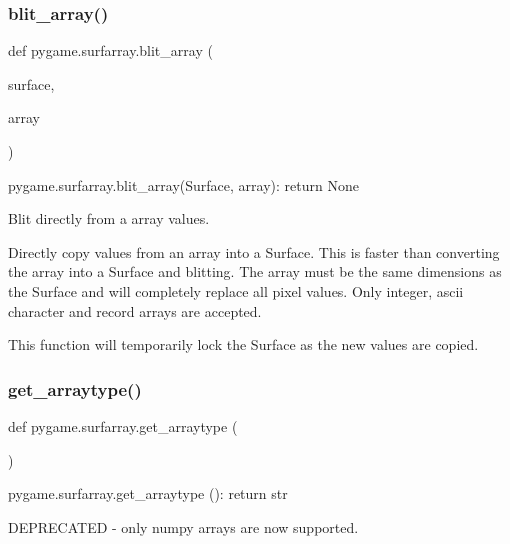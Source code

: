 \subsubsection{\texorpdfstring{blit\+\_\+array()}{blit\_array()}}
{\footnotesize\ttfamily def pygame.\+surfarray.\+blit\+\_\+array (\begin{DoxyParamCaption}\item[{}]{surface,  }\item[{}]{array }\end{DoxyParamCaption})}

\begin{DoxyVerb}pygame.surfarray.blit_array(Surface, array): return None

Blit directly from a array values.

Directly copy values from an array into a Surface. This is faster than
converting the array into a Surface and blitting. The array must be the
same dimensions as the Surface and will completely replace all pixel
values. Only integer, ascii character and record arrays are accepted.

This function will temporarily lock the Surface as the new values are
copied.
\end{DoxyVerb}
 \mbox{\label{namespacepygame_1_1surfarray_aedf2dcad61b5808f388b4e81952c048d}} 
\subsubsection{\texorpdfstring{get\+\_\+arraytype()}{get\_arraytype()}}
{\footnotesize\ttfamily def pygame.\+surfarray.\+get\+\_\+arraytype (\begin{DoxyParamCaption}{ }\end{DoxyParamCaption})}

\begin{DoxyVerb}pygame.surfarray.get_arraytype (): return str

DEPRECATED - only numpy arrays are now supported.
\end{DoxyVerb}
 \mbox{\label{namespacepygame_1_1surfarray_a89e8a065ab841be09f1b694e4035663a}} 
